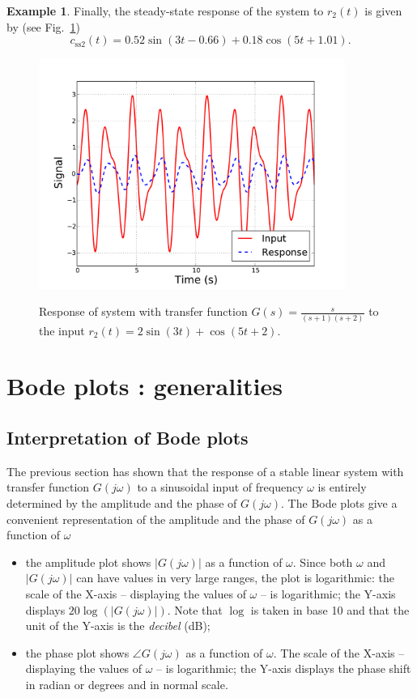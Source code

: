 \documentclass[a4paper,11pt]{report}
\theoremstyle{definition}
\newtheorem{mdexample}{Example}
\newenvironment{example}%
  {\vspace{0.1cm}\begin{mdframed}[backgroundcolor=lightgray]\begin{mdexample}}%
  {\end{mdexample}\end{mdframed}\vspace{0.1cm}}
\begin{document}
\begin{example}
  Finally, the steady-state response of the system to $r_2(t)$ is given
  by (see Fig.~\ref{fig:sine-resp2})
  \[
  c_\mathrm{ss2}(t) = 0.52\sin(3t-0.66) +  0.18\cos(5t+1.01).
  \]

  \begin{figure}[H]
    \centering
    \includegraphics[width=10cm]{fig/sine-resp2.pdf}\\
    \caption{Response of system with transfer function
      $G(s)=\frac{s}{(s+1)(s+2)}$ to the input $r_2(t) = 2\sin(3t) +
      \cos(5t+2)$.} 
    \label{fig:sine-resp2}
  \end{figure}


\end{example}


\section{Bode plots : generalities}

\subsection{Interpretation of Bode plots}

The previous section has shown that the response of a stable linear
system with transfer function $G(j\omega)$ to a sinusoidal input of
frequency $\omega$ is entirely determined by the amplitude and the
phase of $G(j\omega)$. The Bode plots give a convenient representation
of the amplitude and the phase of $G(j\omega)$ as a function of
$\omega$
\begin{itemize}
\item the amplitude plot shows $|G(j\omega)|$ as a function of
  $\omega$. Since both $\omega$ and $|G(j\omega)|$ can have values
  in very large ranges, the plot is logarithmic: the scale of the
  X-axis -- displaying the values of $\omega$ -- is logarithmic; the
  Y-axis displays $20\log(|G(j\omega)|)$. Note that $\log$ is taken
  in base 10 and that the unit of the Y-axis is the \emph{decibel}
  (dB);
\item the phase plot shows $\angle G(j\omega)$ as a function of
  $\omega$. The scale of the X-axis -- displaying the values of
  $\omega$ -- is logarithmic; the Y-axis displays the phase shift in
  radian or degrees and in normal scale.
\end{itemize}
\end{document}
